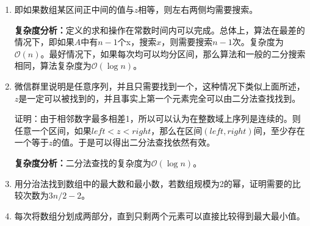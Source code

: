 \documentclass[12pt,a4paper]{article}
\makeatletter
\newtheorem*{solution}{Solution}
\theoremstyle{definition}
\renewenvironment{solution}[1][Solution] {\par\pushQED{\qed}\normalfont\topsep6\p@\@plus6\p@\relax\trivlist\item[\hskip\labelsep\bfseries#1\@addpunct{.}]\ignorespaces}{\popQED\endtrivlist\@endpefalse} \makeatother
\makeatother
\begin{document}
\begin{enumerate}
\begin{solution}
即如果数组某区间正中间的值与$z$相等，则左右两侧均需要搜索。

\textbf{复杂度分析：}定义的求和操作在常数时间内可以完成。总体上，算法在最差的情况下，即如果$A$中有$n-1$个x，搜索$x$，则需要搜索$n-1$次。复杂度为$\mathcal{O}(n)$。最好情况下，如果每次均可以均分区间，那么算法和一般的二分搜索相同，算法复杂度为$\mathcal{O}(\log n)$。
\end{solution}

\begin{solution}
微信群里说明是任意序列，并且只需要找到一个，这种情况下类似上面所述，$z$是一定可以被找到的，并且事实上第一个元素完全可以由二分法查找找到。
	
证明：由于相邻数字最多相差1，所以可以认为在整数域上序列是连续的。则任意一个区间，如果$left<z<right$，那么在区间$(left,right)$间，至少存在一个等于$z$的值。于是可以得出二分法查找依然有效。

	\begin{algorithm}[H]
		\SetAlgoLined
		\caption{$binary\_search(start,end)$}
		
	\end{algorithm}
	
	\textbf{复杂度分析：}二分法查找的复杂度为$\mathcal{O}(\log n)$。
\end{solution}

\item 用分治法找到数组中的最大数和最小数，若数组规模为2的幂，证明需要的比较次数为$3n/2-2$。

\begin{solution}
	每次将数组分划成两部分，直到只剩两个元素可以直接比较得到最大最小值。
	
	\begin{algorithm}[H]
		\SetAlgoLined
		\caption{$min\_max(start,end)$}
	\end{algorithm}


\end{solution}
\end{enumerate}
\end{document}
